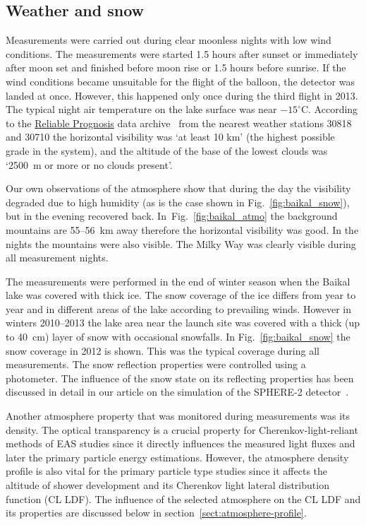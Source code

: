 \documentclass[final,5p,times,twocolumn]{elsarticle}
\begin{document}

\subsection{Weather and snow}

Measurements were carried out during clear moonless nights with low wind conditions. The measurements were started 1.5 hours after sunset or immediately after moon set and finished before moon rise or 1.5 hours before sunrise. If the wind conditions became unsuitable for the flight of the balloon, the detector was landed at once. However, this happened only once during the third flight in 2013. The typical night air temperature on the lake surface was near $-15^\circ$C. According to the \href{https://rp5.ru/Weather_in_the_world}{Reliable Prognosis} data archive~\cite{rp5} from the nearest weather stations 30818 and 30710 the horizontal visibility was `at least 10 km' (the highest possible grade in the system), and the altitude of the base of the lowest clouds was `2500~m or more or no clouds present'.

Our own observations of the atmosphere show that during the day the visibility degraded due to high humidity (as is the case shown in Fig.~\ref{fig:baikal_snow}), but in the evening recovered back. In~Fig.~\ref{fig:baikal_atmo} the background mountains are 55--56~km away therefore the horizontal visibility was good. In the nights the mountains were also visible. The Milky Way was clearly visible during all measurement nights. 

The measurements were performed in the end of winter season when the Baikal lake was covered with thick ice. The snow coverage of the ice differs from year to year and in different areas of the lake according to prevailing winds. However in winters 2010--2013 the lake area near the launch site was covered with a thick (up to 40~cm) layer of snow with occasional snowfalls. In Fig.~\ref{fig:baikal_snow} the snow coverage in 2012 is shown. This was the typical coverage during all measurements. The snow reflection properties were controlled using a photometer. The influence of the snow state on its reflecting properties has been discussed in detail in our article on the simulation of the SPHERE-2 detector~\cite{Ant19}.

Another atmosphere property that was monitored during measurements was its density. The optical transparency is a crucial property for Cherenkov-light-reliant methods of EAS studies since it directly influences the measured light fluxes and later the primary particle energy estimations. However, the atmosphere density profile is also vital for the primary particle type studies since it affects the altitude of shower development and its Cherenkov light lateral distribution function (CL LDF). The influence of the selected atmosphere on the CL LDF and its properties are discussed below in section~\ref{sect:atmosphere-profile}.
\end{document}
